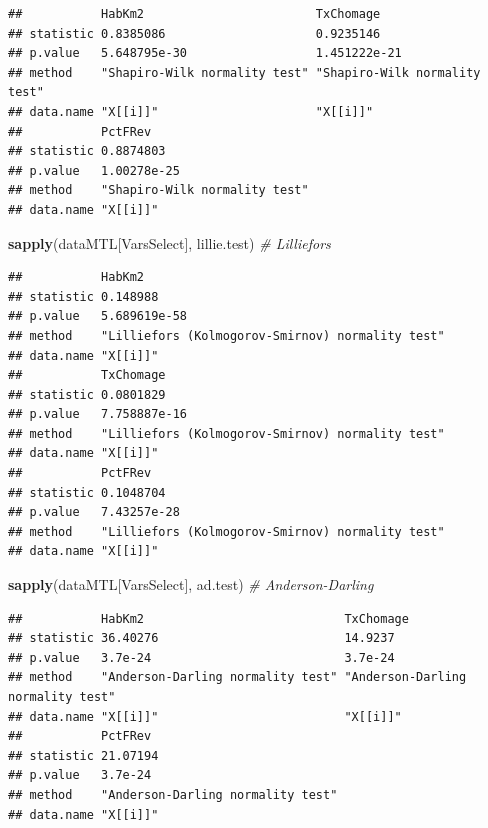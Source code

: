 \documentclass[
  11pt,
  french,
]{book}
\makeatletter
\newenvironment{Shaded}{\begin{snugshade}}{\end{snugshade}}
\newcommand{\CommentTok}[1]{\textcolor[rgb]{0.56,0.35,0.01}{\textit{#1}}}
\newcommand{\KeywordTok}[1]{\textcolor[rgb]{0.13,0.29,0.53}{\textbf{#1}}}
\newcommand{\NormalTok}[1]{#1}
\newenvironment{kframe}{%
\medskip{}
\setlength{\fboxsep}{.8em}
 \def\at@end@of@kframe{}%
 \ifinner\ifhmode%
  \def\at@end@of@kframe{\end{minipage}}%
  \begin{minipage}{\columnwidth}%
 \fi\fi%
 \def\FrameCommand##1{\hskip\@totalleftmargin \hskip-\fboxsep
 \colorbox{shadecolor}{##1}\hskip-\fboxsep
     \hskip-\linewidth \hskip-\@totalleftmargin \hskip\columnwidth}%
 \MakeFramed {\advance\hsize-\width
   \@totalleftmargin\z@ \linewidth\hsize
   \@setminipage}}%
 {\par\unskip\endMakeFramed%
 \at@end@of@kframe}
\renewenvironment{Shaded}{\begin{kframe}}{\end{kframe}}
\makeatother
\begin{document}
\begin{verbatim}
##           HabKm2                        TxChomage                    
## statistic 0.8385086                     0.9235146                    
## p.value   5.648795e-30                  1.451222e-21                 
## method    "Shapiro-Wilk normality test" "Shapiro-Wilk normality test"
## data.name "X[[i]]"                      "X[[i]]"                     
##           PctFRev                      
## statistic 0.8874803                    
## p.value   1.00278e-25                  
## method    "Shapiro-Wilk normality test"
## data.name "X[[i]]"
\end{verbatim}

\begin{Shaded}
\begin{Highlighting}[]
\KeywordTok{sapply}\NormalTok{(dataMTL[VarsSelect], lillie.test)       }\CommentTok{# Lilliefors}
\end{Highlighting}
\end{Shaded}

\begin{verbatim}
##           HabKm2                                          
## statistic 0.148988                                        
## p.value   5.689619e-58                                    
## method    "Lilliefors (Kolmogorov-Smirnov) normality test"
## data.name "X[[i]]"                                        
##           TxChomage                                       
## statistic 0.0801829                                       
## p.value   7.758887e-16                                    
## method    "Lilliefors (Kolmogorov-Smirnov) normality test"
## data.name "X[[i]]"                                        
##           PctFRev                                         
## statistic 0.1048704                                       
## p.value   7.43257e-28                                     
## method    "Lilliefors (Kolmogorov-Smirnov) normality test"
## data.name "X[[i]]"
\end{verbatim}

\begin{Shaded}
\begin{Highlighting}[]
\KeywordTok{sapply}\NormalTok{(dataMTL[VarsSelect], ad.test)           }\CommentTok{# Anderson-Darling}
\end{Highlighting}
\end{Shaded}

\begin{verbatim}
##           HabKm2                            TxChomage                        
## statistic 36.40276                          14.9237                          
## p.value   3.7e-24                           3.7e-24                          
## method    "Anderson-Darling normality test" "Anderson-Darling normality test"
## data.name "X[[i]]"                          "X[[i]]"                         
##           PctFRev                          
## statistic 21.07194                         
## p.value   3.7e-24                          
## method    "Anderson-Darling normality test"
## data.name "X[[i]]"
\end{verbatim}
\end{document}
